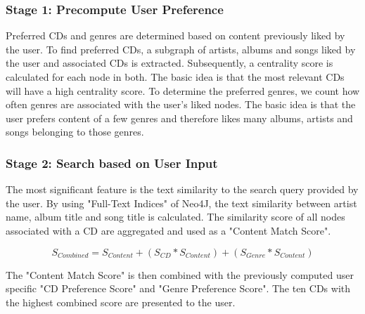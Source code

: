 \documentclass{article}
\begin{document}
\subsubsection{Stage 1: Precompute User Preference}

\noindent
Preferred CDs and genres are determined based on content previously liked by the user. To find preferred CDs, a subgraph of artists, albums and songs liked by the user and associated CDs is extracted. Subsequently, a centrality score is calculated for each node in both. The basic idea is that the most relevant CDs will have a high centrality score. To determine the preferred genres, we count how often genres are associated with the user's liked nodes. The basic idea is that the user prefers content of a few genres and therefore likes many albums, artists and songs belonging to those genres.

\newpage

\subsubsection{Stage 2: Search based on User Input}
\noindent
The most significant feature is the text similarity to the search query provided by the user. By using "Full-Text Indices" of Neo4J, the text similarity between artist name, album title and song title is calculated. The similarity score of all nodes associated with a CD are aggregated and used as a "Content Match Score".

\begin{equation}
    S_{Combined}= S_{Content} + (S_{CD}  * S_{Content} ) + (S_{Genre} * S_{Content} )
\end{equation}

\vspace*{0.5cm}

\noindent
The "Content Match Score" is then combined with the previously computed user specific "CD Preference Score" and "Genre Preference Score". The ten CDs with the highest combined score are presented to the user.
\end{document}
